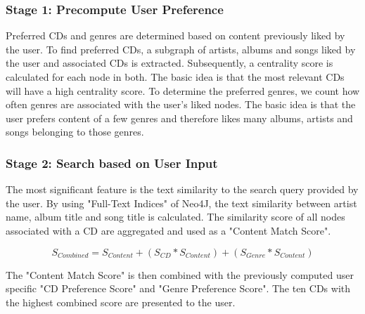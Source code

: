 \documentclass{article}
\begin{document}
\subsubsection{Stage 1: Precompute User Preference}

\noindent
Preferred CDs and genres are determined based on content previously liked by the user. To find preferred CDs, a subgraph of artists, albums and songs liked by the user and associated CDs is extracted. Subsequently, a centrality score is calculated for each node in both. The basic idea is that the most relevant CDs will have a high centrality score. To determine the preferred genres, we count how often genres are associated with the user's liked nodes. The basic idea is that the user prefers content of a few genres and therefore likes many albums, artists and songs belonging to those genres.

\newpage

\subsubsection{Stage 2: Search based on User Input}
\noindent
The most significant feature is the text similarity to the search query provided by the user. By using "Full-Text Indices" of Neo4J, the text similarity between artist name, album title and song title is calculated. The similarity score of all nodes associated with a CD are aggregated and used as a "Content Match Score".

\begin{equation}
    S_{Combined}= S_{Content} + (S_{CD}  * S_{Content} ) + (S_{Genre} * S_{Content} )
\end{equation}

\vspace*{0.5cm}

\noindent
The "Content Match Score" is then combined with the previously computed user specific "CD Preference Score" and "Genre Preference Score". The ten CDs with the highest combined score are presented to the user.
\end{document}
